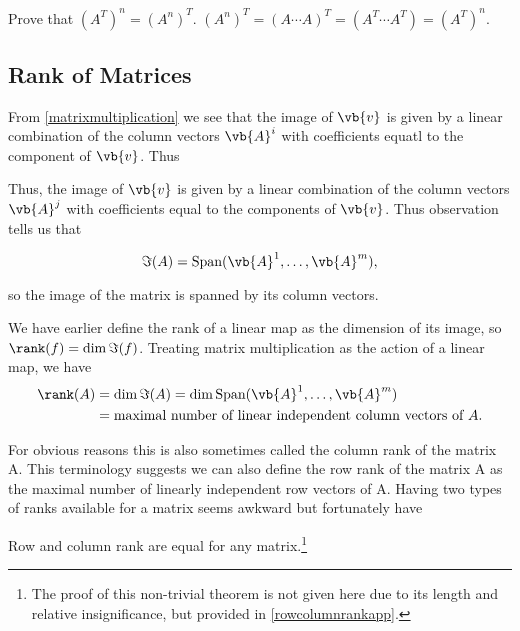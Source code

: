\documentclass[a4paper,12pt]{report}
\begin{document}
{Prove that \((A^T)^{n} = (A^{n} )^T\).}
{\((A^{n} )^{T} = (A \cdots A)^{T} = (A^{T} \cdots A^{T}  ) = (A^{T} )^{n}\). } 


\subsection{Rank of Matrices}

From \cref{matrixmultiplication} we see that the image of \(\vb{v} \) is given by a linear combination of the column vectors \(\vb{A} ^{i}\) with coefficients equatl to the component of \(\vb{v} \). Thus    

Thus, the image of \(\vb{v} \) is given by a linear combination of the column vectors \(\vb{A} ^{j} \) with coefficients equal to the components of \(\vb{v} \). Thus observation tells us that 

\begin{equation}
    \Im (A) = \text{Span}(\vb{A} ^{1} , \ldots , \vb{A} ^{m} ), 
\end{equation}

so the image of the matrix is spanned by its column vectors.

We have earlier define the rank of a linear map as the dimension of its image, so \(\rank (f) = \dim \Im(f)\). Treating matrix multiplication as the action of a linear map, we have 
\begin{equation}
    \begin{aligned}
        \rank (A) &= \dim \Im(A) = \dim \text{Span} (\vb{A} ^{1}, \ldots ,\vb{A} ^{m}  ) \\
        &= \text{maximal number of linear independent column vectors of \(A\)}.
    \end{aligned}
\end{equation}

For obvious reasons this is also sometimes called the column rank of the matrix A. This terminology suggests we can also define the row rank of the matrix A as the maximal number of linearly independent row vectors of A. Having two types of ranks available for a matrix seems awkward but fortunately have

\begin{theorem}\label{rowcolumnrank} 
Row and column rank are equal for any matrix.\footnote{The proof of this non-trivial theorem is not given here due to its length and relative insignificance, but provided in \cref{rowcolumnrankapp}.}
\end{theorem}
\end{document}
